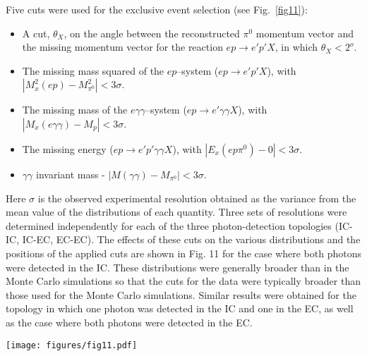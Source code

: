\documentclass[prc,floatfix,twocolumn,superscriptaddress,letter]{revtex4}
\begin{document}
Five cuts were used for the exclusive event selection (see Fig.~\ref{fig11}):
\begin{itemize}
\item  A cut, $\theta_X$,  on the angle between the reconstructed  
$\pi^0$ momentum vector and the missing momentum vector for the reaction $ep\to e'p'X$, in which $\theta_X<2^o$.
\item The missing mass squared of the $ep$--system  ($ep\to e'p'X$), with $| M_x^2(ep) - M^2_{\pi^0}| < 3\sigma$.
\item The missing mass of the $e\gamma\gamma$--system  ($ep\to e'\gamma\gamma X$), with $|M_x(e\gamma\gamma)-M_{p}| < 3\sigma$.
\item The missing energy ($ep\to e'p'\gamma\gamma X$), with $|E_x(ep\pi^0)- 0| < 3\sigma$.
\item$\gamma\gamma$ invariant mass - $|M(\gamma\gamma) - M_{\pi^0}| < 3\sigma$.
\end{itemize}
\noindent
Here $\sigma $ is the observed experimental resolution obtained as the variance from the mean value of the distributions of each quantity. Three sets of resolutions were determined independently for each of the three photon-detection topologies (IC-IC, IC-EC, EC-EC). The effects of these cuts on the various distributions and the positions of the applied cuts  are shown in Fig. 11 for the case where both photons were detected in the IC.
These distributions were generally broader than  in the Monte Carlo simulations so that the cuts for the data were typically broader than those used for the Monte Carlo simulations.
Similar results were obtained for the topology in which one photon was detected in the IC and one in the EC, as well as the case where both photons were detected in the EC.

\begin{figure*}
\texttt{[image: figures/fig11.pdf]}

\caption{
\label{fig11}
(Color online) The exclusivity cuts for $\pi^0$ production for the topology where both decay photons are detected in the IC calorimeter. The graph for each variable  shows  the number of events per channel plotted before (red) and after (black) the cuts on the other variables. Upper left: $\theta_X$ cut: angle between the reconstructed  
$\pi^0$ momentum vector and the missing momentum vector $ep\to e'p'X$. 
Upper middle: Missing mass $M_X^2(ep)$.  
Upper right: Missing mass $M_X(e\gamma\gamma)$. 
Lower left:  Missing energy $E_X(ep\gamma\gamma)$. 
Lower middle: Invariant  mass $M(\gamma\gamma)$.  
Lower right: Same as in lower middle  ($M(\gamma\gamma)$),  but magnified to illustrate the residual background. This background is subtracted from the pion distribution using the wings on either side of the peak, as explained in the text.
The vertical lines denote the positions of the applied cuts on each distribution.\\
}
\end{figure*}
\end{document}
